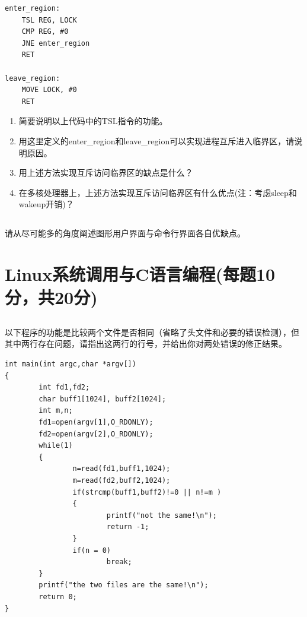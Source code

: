 \documentclass[a4paper,11pt]{article}
\begin{document}
\begin{CJK*}{UTF8}{gbsn}
%
\begin{verbatim}
enter_region:
    TSL REG, LOCK
    CMP REG, #0
    JNE enter_region
    RET

leave_region:
    MOVE LOCK, #0
    RET
\end{verbatim}
\begin{enumerate}
\item 简要说明以上代码中的TSL指令的功能。
\item 用这里定义的enter\_region和leave\_region可以实现进程互斥进入临界区，请说明原因。
\item 用上述方法实现互斥访问临界区的缺点是什么？
\item 在多核处理器上，上述方法实现互斥访问临界区有什么优点(注：考虑sleep和wakeup开销)？
\end{enumerate}

\newpage
\subsection{}
请从尽可能多的角度阐述图形用户界面与命令行界面各自优缺点。

\newpage
\section{Linux系统调用与C语言编程(每题10分，共20分)}

\subsection{}
以下程序的功能是比较两个文件是否相同（省略了头文件和必要的错误检测），但其中两行存在问题，请指出这两行的行号，并给出你对两处错误的修正结果。
%
\begin{verbatim}
int main(int argc,char *argv[])
{
        int fd1,fd2;
        char buff1[1024], buff2[1024];
        int m,n;
        fd1=open(argv[1],O_RDONLY);
        fd2=open(argv[2],O_RDONLY);
        while(1)
        {       
                n=read(fd1,buff1,1024);   
                m=read(fd2,buff2,1024);
                if(strcmp(buff1,buff2)!=0 || n!=m )
                {
                        printf("not the same!\n");
                        return -1;           
                }
                if(n = 0)
                        break;          
        }
        printf("the two files are the same!\n");
        return 0;
}
\end{verbatim}


\end{CJK*}
\end{document}
